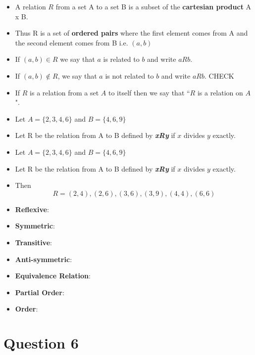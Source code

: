 

\large
\begin{itemize}
\item A relation $R$ from a set A to a set B is a subset of the
\textbf{cartesian product} A x B. 
\item Thus R is a set of \textbf{ordered pairs} where
the first element comes from A and the second element comes
from B i.e. $(a, b)$
\end{itemize}

\large
\begin{itemize}

\item  If $(a, b) \in R$ we say that $a$ is related to $b$ and write $aRb$.
\item If $(a, b) \notin R$, we say that $a$ is not related to $b$ and write $aRb$. CHECK
\item If
$R$ is a relation from a set $A$ to itself then we say that ``$R$ is a relation
on $A$".

\item Let $A = \{2, 3, 4, 6\}$ and $B = \{4, 6, 9\}$
\item Let R be the relation from A to B defined by \textit{\textbf{xRy}} if $x$
divides $y$ exactly.


\item Let $A = \{2, 3, 4, 6\}$ and $B = \{4, 6, 9\}$
\item Let R be the relation from A to B defined by \textit{\textbf{xRy}} if $x$
divides $y$ exactly.
\item  Then
\[R = {(2, 4), (2, 6), (3, 6), (3, 9), (4, 4), (6, 6)}\]
\end{itemize}






\begin{itemize}
\item \textbf{Reflexive}: 
\item \textbf{Symmetric}: 
\item \textbf{Transitive}: 
\item \textbf{Anti-symmetric}: 
\item \textbf{Equivalence Relation}: 
\item \textbf{Partial Order}:
\item \textbf{Order}:
\end{itemize}

\section*{Question 6}

